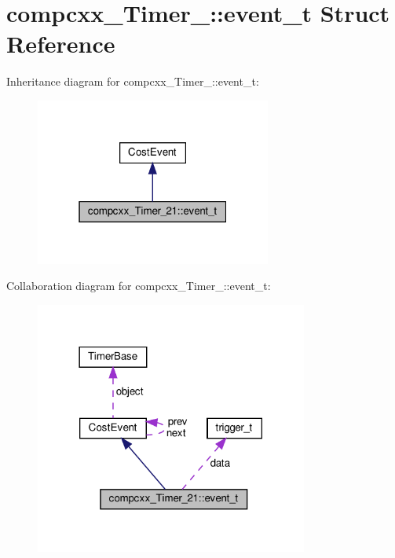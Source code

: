 \hypertarget{structcompcxx__Timer__21_1_1event__t}{}\section{compcxx\+\_\+\+Timer\+\_\+:\+:event\+\_\+t Struct Reference}
\label{structcompcxx__Timer__21_1_1event__t}


Inheritance diagram for compcxx\+\_\+\+Timer\+\_\+:\+:event\+\_\+t\+:\nopagebreak
\begin{figure}[H]
\begin{center}
\leavevmode
\includegraphics[width=220pt]{structcompcxx__Timer__21_1_1event__t__inherit__graph}
\end{center}
\end{figure}


Collaboration diagram for compcxx\+\_\+\+Timer\+\_\+:\+:event\+\_\+t\+:\nopagebreak
\begin{figure}[H]
\begin{center}
\leavevmode
\includegraphics[width=254pt]{structcompcxx__Timer__21_1_1event__t__coll__graph}
\end{center}
\end{figure}
